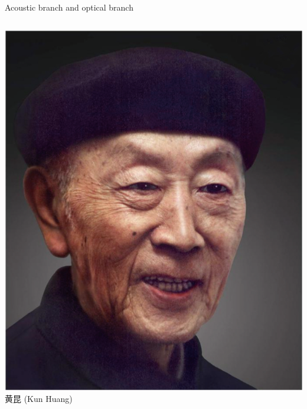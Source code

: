 \documentclass{beamer}
\begin{document}
\begin{frame}{Acoustic branch and optical branch}
  \begin{columns}
    \begin{column}{0.2\textwidth}
      \centering
      \includegraphics[width=\textwidth]{figure/kunhuang.png}
      {\scriptsize 黄昆 (Kun Huang)}
      \  \\
      \  \\
      \  \\


\end{column}
\end{columns}
\end{frame}
\end{document}
